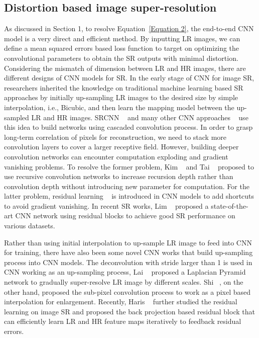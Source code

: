\documentclass[10pt,twocolumn,letterpaper]{article}
\begin{document}
\subsection{Distortion based image super-resolution}

As discussed in Section 1, to resolve Equation~\ref{Equation 2}, the end-to-end CNN model is a very direct and efficient method. By inputting LR images, we can define a mean squared errors based loss function to target on optimizing the convolutional parameters to obtain the SR outputs with minimal distortion. Considering the mismatch of dimension between LR and HR images, there are different designs of CNN models for SR. In the early stage of CNN for image SR, researchers inherited the knowledge on traditional machine learning based SR approaches by initially up-sampling LR images to the desired size by simple interpolation, i.e., Bicubic, and then learn the mapping model between the up-sampled LR and HR images. SRCNN ~\cite{SRCNN} and many other CNN approaches ~\cite{VDSR,DRRN,LapSRN,EDSR,DBPN} use this idea to build networks using cascaded convolution process. In order to grasp long-term correlation of pixels for reconstruction, we need to stack more convolution layers to cover a larger receptive field. However, building deeper convolution networks can encounter computation exploding and gradient vanishing problems. To resolve the former problem, Kim \etal ~\cite{DRCN} and Tai \etal ~\cite{DRRN} proposed to use recursive convolution networks to increase recursion depth rather than convolution depth without introducing new parameter for computation. For the latter problem, residual learning ~\cite{ResNet} is introduced in CNN models to add shortcuts to avoid gradient vanishing. In recent SR works, Lim \etal ~\cite{EDSR} proposed a state-of-the-art CNN network using residual blocks to achieve good SR performance on various datasets. 

Rather than using initial interpolation to up-sample LR image to feed into CNN for training, there have also been some novel CNN works that build up-sampling process into CNN models. The deconvolution with stride larger than 1 is used in CNN working as an up-sampling process, Lai \etal ~\cite{LapSRN} proposed a Laplacian Pyramid network to gradually super-resolve LR image by different scales. Shi \etal ~\cite{ESPCN}, on the other hand, proposed the sub-pixel convolution process to work as a pixel based interpolation for enlargement. Recently, Haris \etal ~\cite{DBPN} further studied the residual learning on image SR and proposed the back projection based residual block that can efficiently learn LR and HR feature maps iteratively to feedback residual errors. 
\end{document}
